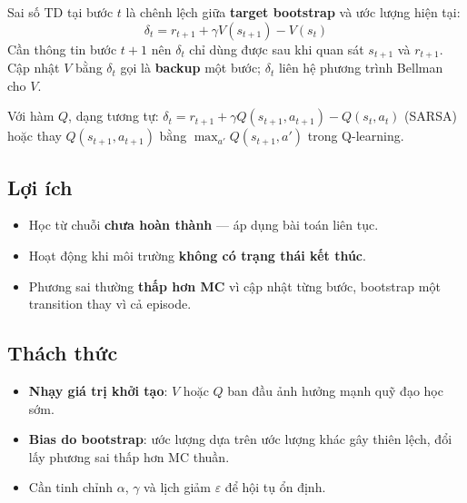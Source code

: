 \begin{dinhnghia}[title={Định nghĩa TD error}]
Sai số TD tại bước $t$ là chênh lệch giữa \textbf{target bootstrap} và ước lượng hiện tại:
\[
\delta_t = r_{t+1} + \gamma V(s_{t+1}) - V(s_t)
\]
Cần thông tin bước $t+1$ nên $\delta_t$ chỉ dùng được sau khi quan sát $s_{t+1}$ và $r_{t+1}$. Cập nhật $V$ bằng $\delta_t$ gọi là \textbf{backup} một bước; $\delta_t$ liên hệ phương trình Bellman cho $V$.
\end{dinhnghia}

\begin{ynghia}[title={TD error với $Q$}]
Với hàm $Q$, dạng tương tự: $\delta_t = r_{t+1} + \gamma Q(s_{t+1}, a_{t+1}) - Q(s_t,a_t)$ (SARSA) hoặc thay $Q(s_{t+1},a_{t+1})$ bằng $\max_{a'} Q(s_{t+1},a')$ trong Q-learning.
\end{ynghia}

\subsection{Lợi ích}

\begin{tinhchat}[title={Lợi ích TD}]
\begin{itemize}
  \item Học từ chuỗi \textbf{chưa hoàn thành} --- áp dụng bài toán liên tục.
  \item Hoạt động khi môi trường \textbf{không có trạng thái kết thúc}.
  \item Phương sai thường \textbf{thấp hơn MC} vì cập nhật từng bước, bootstrap một transition thay vì cả episode.
\end{itemize}
\end{tinhchat}

\subsection{Thách thức}

\begin{luuy}[title={Thách thức TD}]
\begin{itemize}
  \item \textbf{Nhạy giá trị khởi tạo}: $V$ hoặc $Q$ ban đầu ảnh hưởng mạnh quỹ đạo học sớm.
  \item \textbf{Bias do bootstrap}: ước lượng dựa trên ước lượng khác gây thiên lệch, đổi lấy phương sai thấp hơn MC thuần.
  \item Cần tinh chỉnh $\alpha$, $\gamma$ và lịch giảm $\varepsilon$ để hội tụ ổn định.
\end{itemize}
\end{luuy}

